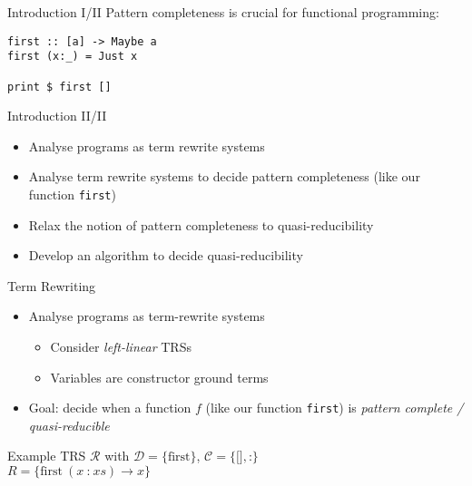 \begin{frame}[fragile]{Introduction I/II}
Pattern completeness is crucial for functional programming:
\begin{lstlisting}
first :: [a] -> Maybe a
first (x:_) = Just x

print $ first []
\end{lstlisting}
\vspace{0.5cm}

\end{frame}

\begin{frame}{Introduction II/II}
\begin{itemize}
    \item Analyse programs as term rewrite systems
    \item Analyse term rewrite systems to decide pattern completeness (like our function \texttt{first})
    \item Relax the notion of pattern completeness to quasi-reducibility
    \item Develop an algorithm to decide quasi-reducibility
\end{itemize}
\end{frame}

\begin{frame}{Term Rewriting}
\begin{itemize}
    \item Analyse programs as term-rewrite systems
    \begin{itemize}
        \item Consider \textit{left-linear} TRSs
        \item Variables are constructor ground terms
    \end{itemize}
    \item Goal: decide when a function $f$ (like our function \texttt{first}) is \textit{pattern complete / quasi-reducible}
\end{itemize}

\begin{block}{Example}
    TRS $\mathcal{R}$ with $\mathcal{D} = \{\text{first}\}$, $\mathcal{C} = \{\texttt{[]}, \texttt{:}\}$ \\
    $R = \{\text{first}\ (x\ \texttt{:}\ xs) \to x\}$
\end{block}
\end{frame}

